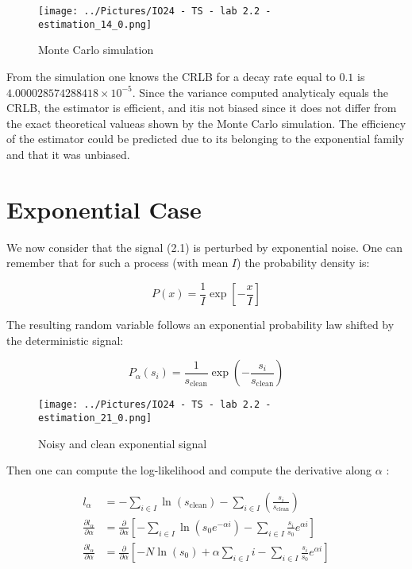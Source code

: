 \begin{figure}[h]
  \centering
  \texttt{[image: ../Pictures/IO24 - TS - lab 2.2 - estimation\_14\_0.png]}
  \caption{Monte Carlo simulation}
\end{figure}

From the simulation one knows the CRLB for a decay rate equal to \( 0.1 \) is \( 4.000028574288418 \times 10^{-5} \). Since the variance computed analyticaly equals the CRLB, the estimator is efficient, and itis not biased since it does not differ from the exact theoretical valueas shown by the Monte Carlo simulation. The efficiency of the estimator could be predicted due to its belonging to the exponential family and that it was unbiased.

\pagebreak

\section{Exponential Case}

We now consider that the signal (2.1) is perturbed by exponential noise. One can remember that for such a process (with mean \(I\)) the probability density is:

\[
P(x) = \frac{1}{I} \exp \left[-\frac{x}{I}\right]
\]

The resulting random variable follows an exponential probability law shifted by the deterministic signal:

\[
P_{\alpha}(s_i) = \frac{1}{s_{\text{clean}}} \exp \left(-\frac{s_i}{s_{\text{clean}}}\right)
\]

\begin{figure}[h]
  \centering
  \texttt{[image: ../Pictures/IO24 - TS - lab 2.2 - estimation\_21\_0.png]}
  \caption{Noisy and clean exponential signal}
\end{figure}

\pagebreak

Then one can compute the log-likelihood and compute the derivative along \( \alpha \) :

\[
\begin{aligned}
l_{\alpha} &= -\sum_{i \in I} \ln \left(s_{\text{clean}}\right) - \sum_{i \in I} \left(\frac{s_i}{s_{\text{clean}}}\right) \\
\frac{\partial l_{\alpha}}{\partial \alpha} &= \frac{\partial}{\partial \alpha}\left[-\sum_{i \in I} \ln \left(s_0 e^{-\alpha i}\right) - \sum_{i \in I} \frac{s_i}{s_0} e^{\alpha i}\right] \\
\frac{\partial l_{\alpha}}{\partial \alpha} &= \frac{\partial}{\partial \alpha}\left[-N \ln (s_0) + \alpha \sum_{i \in I} i - \sum_{i \in I} \frac{s_i}{s_0} e^{\alpha i}\right]
\end{aligned}
\]

